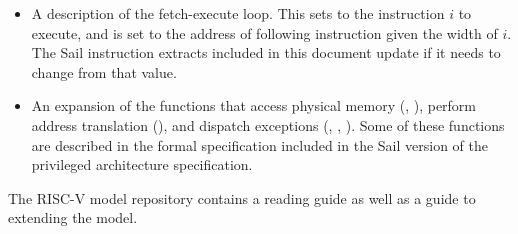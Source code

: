 \begin{itemize}
\item A description of the fetch-execute loop.  This sets 
  to the instruction $i$ to execute, and  is set to the
  address of following instruction given the width of $i$.  The Sail
  instruction extracts included in this document update
   if it needs to change from that value.
\item An expansion of the functions that access physical memory
  (, ), perform
  address translation (), and dispatch
  exceptions (, ,
  ).  Some of these functions are
  described in the formal specification included in the Sail version
  of the privileged architecture specification.
\end{itemize}

The RISC-V model repository contains a reading guide as well as a
guide to extending the model.
